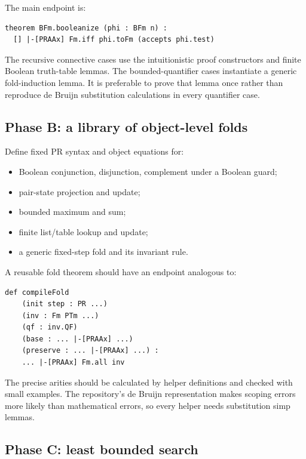 The main endpoint is:

\begin{lstlisting}[language=Lean]
theorem BFm.booleanize (phi : BFm n) :
  [] |-[PRAAx] Fm.iff phi.toFm (accepts phi.test)
\end{lstlisting}

The recursive connective cases use the intuitionistic proof constructors and finite Boolean truth-table lemmas.  The bounded-quantifier cases instantiate a generic fold-induction lemma.  It is preferable to prove that lemma once rather than reproduce de Bruijn substitution calculations in every quantifier case.

\subsection{Phase B: a library of object-level folds}

Define fixed PR syntax and object equations for:

\begin{itemize}
  \item Boolean conjunction, disjunction, complement under a Boolean guard;
  \item pair-state projection and update;
  \item bounded maximum and sum;
  \item finite list/table lookup and update;
  \item a generic fixed-step fold and its invariant rule.
\end{itemize}

A reusable fold theorem should have an endpoint analogous to:

\begin{lstlisting}[language=Lean]
def compileFold
    (init step : PR ...)
    (inv : Fm PTm ...)
    (qf : inv.QF)
    (base : ... |-[PRAAx] ...)
    (preserve : ... |-[PRAAx] ...) :
    ... |-[PRAAx] Fm.all inv
\end{lstlisting}

The precise arities should be calculated by helper definitions and checked with small examples.  The repository's de Bruijn representation makes scoping errors more likely than mathematical errors, so every helper needs substitution simp lemmas.

\subsection{Phase C: least bounded search}

